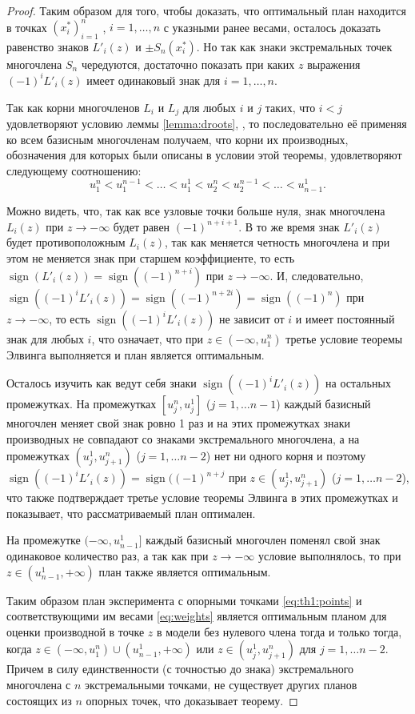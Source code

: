 \documentclass[specialist,
               substylefile = spbu.rtx,
               subf,href,colorlinks=true, 12pt]{disser}
\theoremstyle{definition}
\DeclareMathOperator*{\sign}{sign}
\begin{document}
\begin{proof}
	Таким образом для того, чтобы доказать, что оптимальный план находится в точках $(x_i^*)_{i=1}^n$ , $i = 1, \ldots, n$ с указными ранее весами, осталось доказать равенство знаков $L'_i(z)$ и $\pm S_n(x_i^*)$. Но так как знаки экстремальных точек многочлена $S_n$ чередуются, достаточно показать при каких $z$ выражения $(-1)^i L'_i(z)$ имеет одинаковый знак для $i=1,\ldots , n$.
	
	Так как корни многочленов $L_i$ и $L_j$ для любых $i$ и $j$ таких, что $i < j$ удовлетворяют условию леммы \ref{lemma:droots}, , то последовательно её применяя ко всем базисным многочленам получаем, что корни их производных, обозначения для которых были описаны в условии этой теоремы, удовлетворяют следующему соотношению:
	\begin{equation*}
		u^n_1 < u^{n-1}_1 < \ldots < u^1_1 < u^n_2 < u^{n-1}_2 < \ldots < u_{n-1}^1.
	\end{equation*}
	
	Можно видеть, что, так как все узловые точки больше нуля, знак многочлена $L_i(z)$ при $z \to -\infty$ будет равен $(-1)^{n+i+1}$. В то же время знак $L'_i(z)$ будет противоположным $L_i(z)$, так как меняется четность многочлена и при этом не меняется знак при старшем коэффициенте, то есть $\sign(L'_i(z)) = \sign((-1)^{n+i})$ при $z \to -\infty$. И, следовательно, $\sign((-1)^i L'_i(z)) = \sign((-1)^{n+2i}) = \sign((-1)^{n})$ при $z \to -\infty$, то есть $\sign((-1)^i L'_i(z))$ не зависит от $i$ и имеет постоянный знак для любых $i$, что означает, что при $z \in (-\infty, u_1^n)$ третье условие теоремы Элвинга выполняется и план является оптимальным.
	
	Осталось изучить как ведут себя знаки $\sign((-1)^i L'_i(z))$ на остальных промежутках. На промежутках $[u_j^n, u_j^1]$ ($j = 1, \ldots {n-1}$) каждый базисный многочлен меняет свой знак ровно 1 раз и на этих промежутках знаки производных не совпадают со знаками экстремального многочлена, а на промежутках $(u_j^1, u_{j+1}^n)$ ($j=1, \ldots n-2$) нет ни одного корня и поэтому $\sign((-1)^i L'_i(z)) = \sign ((-1)^{n + j}$ при $z \in (u_j^1, u_{j+1}^n)$ ($j=1, \ldots n-2$), что также подтверждает третье условие теоремы Элвинга в этих промежутках и показывает, что рассматриваемый план оптимален.
	
	На промежутке $(-\infty, u_{n-1}^1]$ каждый базисный многочлен поменял свой знак одинаковое количество раз, а так как при $z \to -\infty$ условие выполнялось, то при $z \in (u_{n-1}^1, +\infty)$ план также является оптимальным.
	
	Таким образом план эксперимента с опорными точками \eqref{eq:th1:points} и соответствующими им весами \eqref{eq:weights} является оптимальным планом для оценки производной в точке $z$ в модели без нулевого члена тогда и только тогда, когда $z \in  (-\infty, u_1^n) \cup (u_{n-1}^1, +\infty)$ или $z \in (u_{j}^1, u_{j+1}^n)$ для $j=1, \ldots n-2$. Причем в силу единственности (с точностью до знака) экстремального многочлена с $n$ экстремальными точками, не существует других планов состоящих из $n$ опорных точек, что доказывает теорему.

	\end{proof}
	
\end{document}

